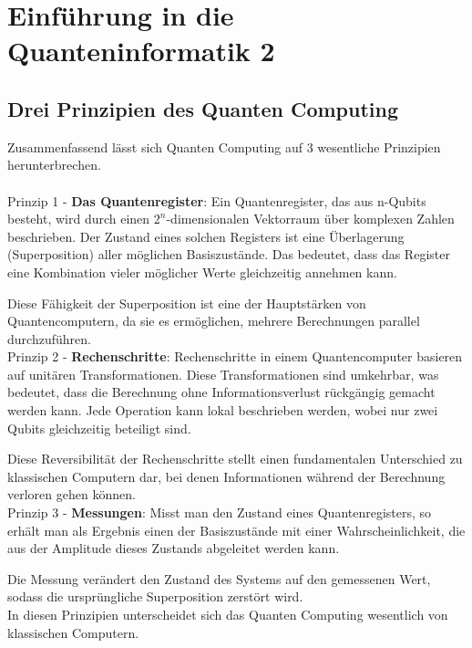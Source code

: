 \section{Einführung in die Quanteninformatik 2}
\label{sec:einfuehrung-in-die-quanteninformatik-2}

\subsection{Drei Prinzipien des Quanten Computing}
\label{subsec:drei-prinzipien-des-quanten-computing}

Zusammenfassend lässt sich Quanten Computing auf 3 wesentliche Prinzipien herunterbrechen.\\\\
Prinzip 1 - \textbf{Das Quantenregister}: Ein Quantenregister, das aus n-Qubits besteht, wird durch einen $2^n$-dimensionalen Vektorraum über komplexen Zahlen beschrieben.
Der Zustand eines solchen Registers ist eine Überlagerung (Superposition) aller möglichen Basiszustände.
Das bedeutet, dass das Register eine Kombination vieler möglicher Werte gleichzeitig annehmen kann.

Diese Fähigkeit der Superposition ist eine der Hauptstärken von Quantencomputern, da sie es ermöglichen, mehrere Berechnungen parallel durchzuführen.\\

Prinzip 2 - \textbf{Rechenschritte}: Rechenschritte in einem Quantencomputer basieren auf unitären Transformationen.
Diese Transformationen sind umkehrbar, was bedeutet, dass die Berechnung ohne Informationsverlust rückgängig gemacht werden kann.
Jede Operation kann lokal beschrieben werden, wobei nur zwei Qubits gleichzeitig beteiligt sind.

Diese Reversibilität der Rechenschritte stellt einen fundamentalen Unterschied zu klassischen Computern dar, bei denen Informationen während der Berechnung verloren gehen können.\\

Prinzip 3 - \textbf{Messungen}: Misst man den Zustand eines Quantenregisters, so erhält man als Ergebnis einen der Basiszustände mit einer Wahrscheinlichkeit, die aus der Amplitude dieses Zustands abgeleitet werden kann.

Die Messung verändert den Zustand des Systems auf den gemessenen Wert, sodass die ursprüngliche Superposition zerstört wird.\\

In diesen Prinzipien unterscheidet sich das Quanten Computing wesentlich von klassischen Computern.\\


